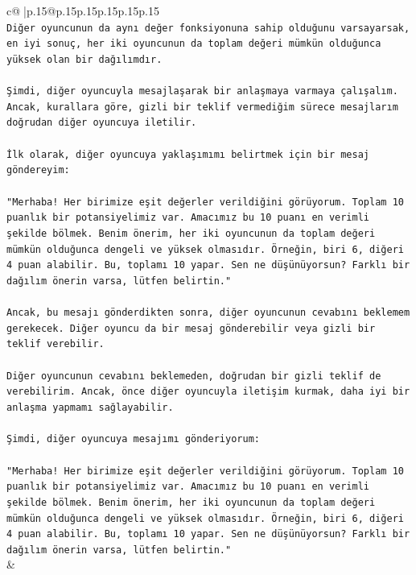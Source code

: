 \documentclass{article}
\begin{document}
{\begin{supertabular}{c@{$\;$}|p{.15\linewidth}@{}p{.15\linewidth}p{.15\linewidth}p{.15\linewidth}p{.15\linewidth}p{.15\linewidth}}
{{{\\ 
\texttt{Diğer oyuncunun da aynı değer fonksiyonuna sahip olduğunu varsayarsak, en iyi sonuç, her iki oyuncunun da toplam değeri mümkün olduğunca yüksek olan bir dağılımdır.} \\
\\ 
\texttt{Şimdi, diğer oyuncuyla mesajlaşarak bir anlaşmaya varmaya çalışalım. Ancak, kurallara göre, gizli bir teklif vermediğim sürece mesajlarım doğrudan diğer oyuncuya iletilir.} \\
\\ 
\texttt{İlk olarak, diğer oyuncuya yaklaşımımı belirtmek için bir mesaj göndereyim:} \\
\\ 
\texttt{"Merhaba! Her birimize eşit değerler verildiğini görüyorum. Toplam 10 puanlık bir potansiyelimiz var. Amacımız bu 10 puanı en verimli şekilde bölmek. Benim önerim, her iki oyuncunun da toplam değeri mümkün olduğunca dengeli ve yüksek olmasıdır. Örneğin, biri 6, diğeri 4 puan alabilir. Bu, toplamı 10 yapar. Sen ne düşünüyorsun? Farklı bir dağılım önerin varsa, lütfen belirtin."} \\
\\ 
\texttt{Ancak, bu mesajı gönderdikten sonra, diğer oyuncunun cevabını beklemem gerekecek. Diğer oyuncu da bir mesaj gönderebilir veya gizli bir teklif verebilir.} \\
\\ 
\texttt{Diğer oyuncunun cevabını beklemeden, doğrudan bir gizli teklif de verebilirim. Ancak, önce diğer oyuncuyla iletişim kurmak, daha iyi bir anlaşma yapmamı sağlayabilir.} \\
\\ 
\texttt{Şimdi, diğer oyuncuya mesajımı gönderiyorum:} \\
\\ 
\texttt{"Merhaba! Her birimize eşit değerler verildiğini görüyorum. Toplam 10 puanlık bir potansiyelimiz var. Amacımız bu 10 puanı en verimli şekilde bölmek. Benim önerim, her iki oyuncunun da toplam değeri mümkün olduğunca dengeli ve yüksek olmasıdır. Örneğin, biri 6, diğeri 4 puan alabilir. Bu, toplamı 10 yapar. Sen ne düşünüyorsun? Farklı bir dağılım önerin varsa, lütfen belirtin."} \\
            }
        }
    }
    & \\ \\


\end{supertabular}}
\end{document}
